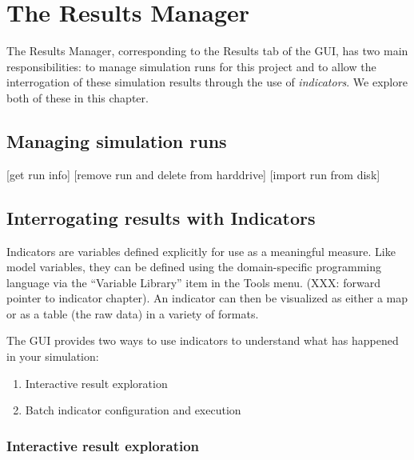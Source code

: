 

\chapter{The Results Manager}

The Results Manager, corresponding to the Results tab of the GUI, has
two main responsibilities: to manage simulation runs for this project
and to allow the interrogation of these simulation results through
the use of \emph{indicators}. We explore both of these in this
chapter.

\section{Managing simulation runs}

[get run info]
[remove run and delete from harddrive]
[import run from disk]


\section{Interrogating results with Indicators}

Indicators are variables defined explicitly
for use as a meaningful measure. Like model variables, they can be
defined using the domain-specific programming language via the
``Variable Library'' item in the Tools menu. (XXX: forward pointer to
indicator chapter). An indicator can then be visualized as either a
map or as a table (the raw data) in a variety of formats. 

The GUI provides two ways to use indicators to understand what has
happened in your simulation:
\begin{enumerate}
  \item Interactive result exploration
  \item Batch indicator configuration and execution
\end{enumerate} 

\subsection{Interactive result exploration}

